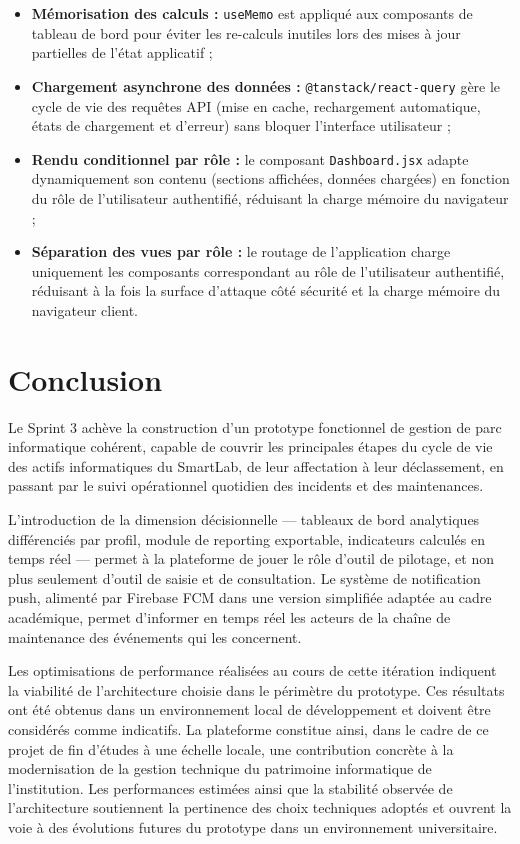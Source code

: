 \begin{itemize}
    \item \textbf{Mémorisation des calculs :} \texttt{useMemo} est appliqué aux composants de tableau de bord pour éviter les re-calculs inutiles lors des mises à jour partielles de l'état applicatif ;

    \item \textbf{Chargement asynchrone des données :} \texttt{@tanstack/react-query} gère le cycle de vie des requêtes API (mise en cache, rechargement automatique, états de chargement et d'erreur) sans bloquer l'interface utilisateur ;

    \item \textbf{Rendu conditionnel par rôle :} le composant \texttt{Dashboard.jsx} adapte dynamiquement son contenu (sections affichées, données chargées) en fonction du rôle de l'utilisateur authentifié, réduisant la charge mémoire du navigateur ;

    \item \textbf{Séparation des vues par rôle :} le routage de l'application charge uniquement les composants correspondant au rôle de l'utilisateur authentifié, réduisant à la fois la surface d'attaque côté sécurité et la charge mémoire du navigateur client.
\end{itemize}

\section*{Conclusion}

Le Sprint 3 achève la construction d'un prototype fonctionnel de gestion de parc informatique cohérent, capable de couvrir les principales étapes du cycle de vie des actifs informatiques du SmartLab, de leur affectation à leur déclassement, en passant par le suivi opérationnel quotidien des incidents et des maintenances.

L'introduction de la dimension décisionnelle — tableaux de bord analytiques différenciés par profil, module de reporting exportable, indicateurs calculés en temps réel — permet à la plateforme de jouer le rôle d'outil de pilotage, et non plus seulement d'outil de saisie et de consultation. Le système de notification push, alimenté par Firebase FCM dans une version simplifiée adaptée au cadre académique, permet d’informer en temps réel les acteurs de la chaîne de maintenance des événements qui les concernent.

Les optimisations de performance réalisées au cours de cette itération indiquent la viabilité de l'architecture choisie dans le périmètre du prototype. Ces résultats ont été obtenus dans un environnement local de développement et doivent être considérés comme indicatifs. La plateforme constitue ainsi, dans le cadre de ce projet de fin d’études à une échelle locale, une contribution concrète à la modernisation de la gestion technique du patrimoine informatique de l'institution. Les performances estimées ainsi que la stabilité observée de l’architecture soutiennent la pertinence des choix techniques adoptés et ouvrent la voie à des évolutions futures du prototype dans un environnement universitaire.
